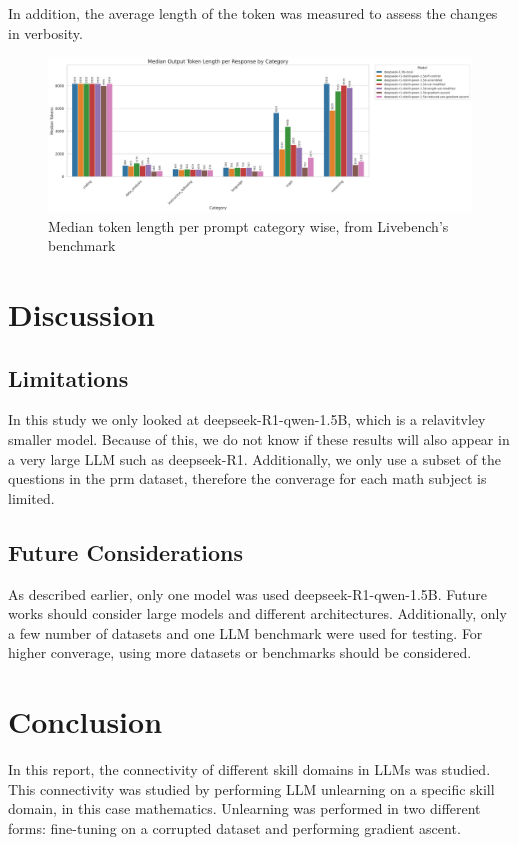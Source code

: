 \documentclass[10.5pt]{article}
\begin{document}
In addition, the average length of the token was measured to assess the changes in verbosity.
\begin{figure}[h]
    \centering
    \includegraphics[width=1\linewidth]{token_length_median_by_category.png}
    \caption{Median token length per prompt category wise, from Livebench's benchmark}
    \label{fig:enter-label}
\end{figure}


\section{Discussion}
\subsection{Limitations}
In this study we only looked at deepseek-R1-qwen-1.5B, which is a relavitvley smaller model. Because of this, we do not know if these results will also appear in a very large LLM such as deepseek-R1. Additionally, we only use a subset of the questions in the prm dataset\cite{lightman2023lets}, therefore the converage for each math subject is limited.
\subsection{Future Considerations}
As described earlier, only one model was used deepseek-R1-qwen-1.5B. Future works should consider large models and different architectures. Additionally, only a few number of datasets and one LLM benchmark were used for testing. For higher converage, using more datasets or benchmarks should be considered.
\section{Conclusion}
In this report, the connectivity of different skill domains in LLMs was studied. This connectivity was studied by performing LLM unlearning on a specific skill domain, in this case mathematics. Unlearning was performed in two different forms: fine-tuning on a corrupted dataset and performing gradient ascent.




\end{document}
